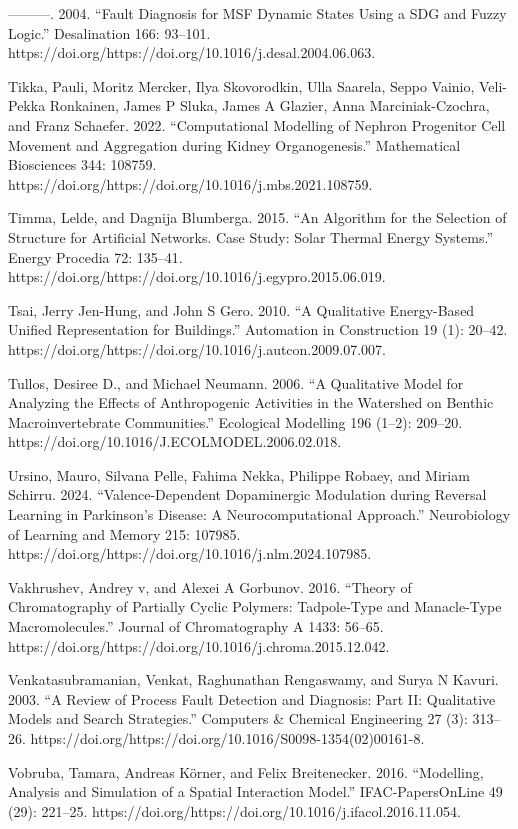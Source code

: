 \documentclass[utf8]{gradu3}
\begin{document}
———. 2004. “Fault Diagnosis for MSF Dynamic States Using a SDG and Fuzzy Logic.” Desalination 166: 93–101. https://doi.org/https://doi.org/10.1016/j.desal.2004.06.063.

Tikka, Pauli, Moritz Mercker, Ilya Skovorodkin, Ulla Saarela, Seppo Vainio, Veli-Pekka Ronkainen, James P Sluka, James A Glazier, Anna Marciniak-Czochra, and Franz Schaefer. 2022. “Computational Modelling of Nephron Progenitor Cell Movement and Aggregation during Kidney Organogenesis.” Mathematical Biosciences 344: 108759. https://doi.org/https://doi.org/10.1016/j.mbs.2021.108759.

Timma, Lelde, and Dagnija Blumberga. 2015. “An Algorithm for the Selection of Structure for Artificial Networks. Case Study: Solar Thermal Energy Systems.” Energy Procedia 72: 135–41. https://doi.org/https://doi.org/10.1016/j.egypro.2015.06.019.

Tsai, Jerry Jen-Hung, and John S Gero. 2010. “A Qualitative Energy-Based Unified Representation for Buildings.” Automation in Construction 19 (1): 20–42. https://doi.org/https://doi.org/10.1016/j.autcon.2009.07.007.

Tullos, Desiree D., and Michael Neumann. 2006. “A Qualitative Model for Analyzing the Effects of Anthropogenic Activities in the Watershed on Benthic Macroinvertebrate Communities.” Ecological Modelling 196 (1–2): 209–20. https://doi.org/10.1016/J.ECOLMODEL.2006.02.018.

Ursino, Mauro, Silvana Pelle, Fahima Nekka, Philippe Robaey, and Miriam Schirru. 2024. “Valence-Dependent Dopaminergic Modulation during Reversal Learning in Parkinson’s Disease: A Neurocomputational Approach.” Neurobiology of Learning and Memory 215: 107985. https://doi.org/https://doi.org/10.1016/j.nlm.2024.107985.

Vakhrushev, Andrey v, and Alexei A Gorbunov. 2016. “Theory of Chromatography of Partially Cyclic Polymers: Tadpole-Type and Manacle-Type Macromolecules.” Journal of Chromatography A 1433: 56–65. https://doi.org/https://doi.org/10.1016/j.chroma.2015.12.042.

Venkatasubramanian, Venkat, Raghunathan Rengaswamy, and Surya N Kavuri. 2003. “A Review of Process Fault Detection and Diagnosis: Part II: Qualitative Models and Search Strategies.” Computers \& Chemical Engineering 27 (3): 313–26. https://doi.org/https://doi.org/10.1016/S0098-1354(02)00161-8.

Vobruba, Tamara, Andreas Körner, and Felix Breitenecker. 2016. “Modelling, Analysis and Simulation of a Spatial Interaction Model.” IFAC-PapersOnLine 49 (29): 221–25. https://doi.org/https://doi.org/10.1016/j.ifacol.2016.11.054.
\end{document}
